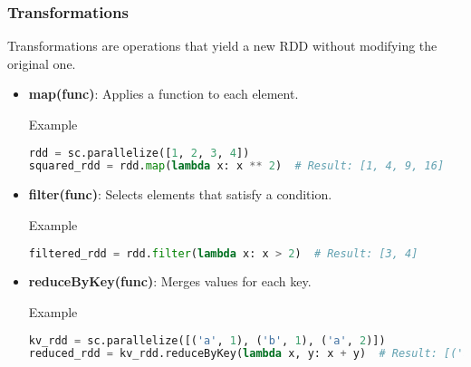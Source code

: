 \documentclass[aspectratio=169]{beamer}
\begin{document}
\begin{frame}[fragile]
    \frametitle{Transformations}
    Transformations are operations that yield a new RDD without modifying the original one.

    \begin{itemize}
        \item \textbf{map(func)}: Applies a function to each element.
        \begin{block}{Example}
        \begin{lstlisting}[language=Python]
rdd = sc.parallelize([1, 2, 3, 4])
squared_rdd = rdd.map(lambda x: x ** 2)  # Result: [1, 4, 9, 16]
        \end{lstlisting}
        \end{block}

        \item \textbf{filter(func)}: Selects elements that satisfy a condition.
        \begin{block}{Example}
        \begin{lstlisting}[language=Python]
filtered_rdd = rdd.filter(lambda x: x > 2)  # Result: [3, 4]
        \end{lstlisting}
        \end{block}

        \item \textbf{reduceByKey(func)}: Merges values for each key.
        \begin{block}{Example}
        \begin{lstlisting}[language=Python]
kv_rdd = sc.parallelize([('a', 1), ('b', 1), ('a', 2)])
reduced_rdd = kv_rdd.reduceByKey(lambda x, y: x + y)  # Result: [('a', 3), ('b', 1)]
        \end{lstlisting}
        \end{block}
    \end{itemize}
\end{frame}
\end{document}
